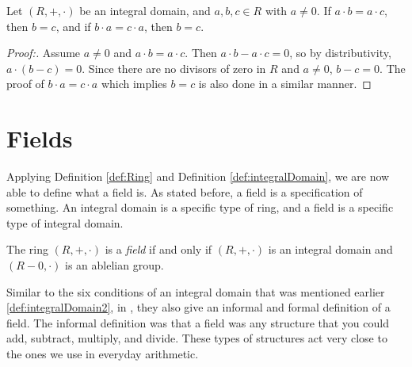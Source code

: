 \documentclass{article}
\begin{document}
\begin{theorem}\label{thm:multiplicative_theorem}
    Let $(R,+,\cdot)$ be an integral domain, and $a,b,c \in R$ with $a \neq 0$. If $a \cdot b = a \cdot c$, then $b=c$,
    and if $b \cdot a = c \cdot a$, then $b=c$.
\end{theorem} \cite{AdvancedMath}

\begin{proof}[Proof:]
    Assume $a \neq 0$ and $a \cdot b = a\cdot c$. Then $a \cdot b - a \cdot c = 0$, so by distributivity, $a \cdot (b-c) =0$. Since there are no divisors of zero in $R$ and $a \neq 0$, $b - c = 0$. The proof of $b \cdot a = c \cdot a$ which implies $b=c$ is also done in a similar manner.
\end{proof}



\section{Fields}

Applying Definition \ref{def:Ring} and Definition \ref{def:integralDomain}, we are now able to define what a field is. As stated before, a field is a specification of something. An integral domain is a specific type of ring, and a field is a specific type of integral domain.

\begin{definition}[Field]
    The ring $(R, +, \cdot)$ is a \emph{field} if and only if $(R, +, \cdot)$ is an integral domain and $(R-{0}, \cdot)$ is an ablelian 
    group.
\end{definition} \cite{AdvancedMath}

    Similar to the six conditions of an integral domain that was mentioned earlier \ref{def:integralDomain2}, in \cite{Concrete}, they also give an informal and formal definition of a field. The informal definition was that a field was any structure that you could add, subtract, multiply, and divide. These types of structures act very close to the ones we use in everyday arithmetic.
\end{document}
